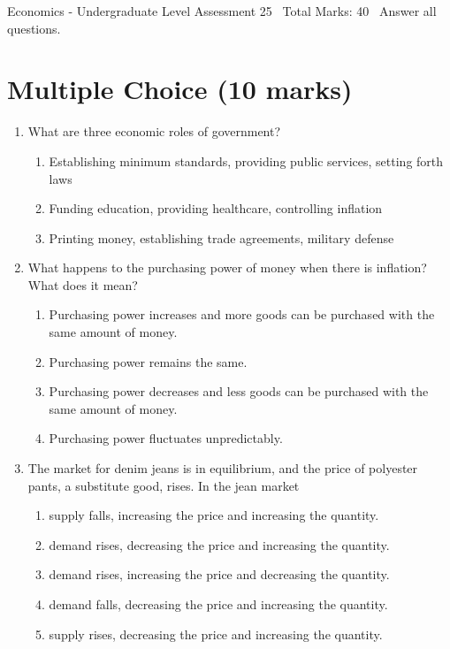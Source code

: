 \documentclass[12pt]{article}
\begin{document}
\begin{center}
Economics - Undergraduate Level Assessment 25 \
Total Marks: 40 \
Answer all questions.
\end{center}

\section*{Multiple Choice (10 marks)}
\begin{enumerate}[label=\arabic*.]
\item What are three economic roles of government?
\begin{enumerate}[label=(\alph*)]
    \item Establishing minimum standards, providing public services, setting forth laws
    \item Funding education, providing healthcare, controlling inflation
    \item Printing money, establishing trade agreements, military defense
\end{enumerate}
\item What happens to the purchasing power of money when there is inflation? What does it mean?
\begin{enumerate}[label=(\alph*)]
    \item Purchasing power increases and more goods can be purchased with the same amount of money.
    \item Purchasing power remains the same.
    \item Purchasing power decreases and less goods can be purchased with the same amount of money.
    \item Purchasing power fluctuates unpredictably.
\end{enumerate}
\item The market for denim jeans is in equilibrium, and the price of polyester pants, a substitute good, rises. In the jean market
\begin{enumerate}[label=(\alph*)]
    \item supply falls, increasing the price and increasing the quantity.
    \item demand rises, decreasing the price and increasing the quantity.
    \item demand rises, increasing the price and decreasing the quantity.
    \item demand falls, decreasing the price and increasing the quantity.
    \item supply rises, decreasing the price and increasing the quantity.

\end{enumerate}
\end{enumerate}
\end{document}

